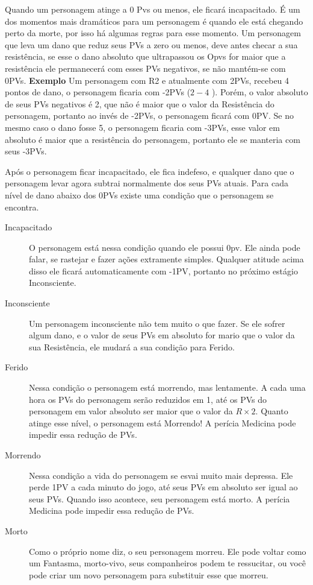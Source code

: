 Quando um personagem atinge a 0 Pvs ou menos, ele ficará incapacitado. É um dos momentos mais dramáticos para um personagem é quando ele está chegando perto da morte, por isso há algumas regras para esse momento. Um personagem que leva um dano que reduz seus PVs a zero ou menos, deve antes checar a sua resistência, se esse o dano absoluto que ultrapassou os Opvs for maior que a resistência ele permanecerá com esses PVs negativos, se não mantém-se com 0PVs. {\bf Exemplo } Um personagem com R2 e atualmente com 2PVs, recebeu 4 pontos de dano, o personagem ficaria com -2PVs (\( 2 -4 \) ). Porém, o valor absoluto de seus PVs negativos é 2, que não é maior que o valor da Resistência do personagem, portanto ao invés de -2PVs, o personagem ficará com 0PV. Se no mesmo caso o dano fosse 5, o personagem ficaria com -3PVs, esse valor em absoluto é maior que a resistência do personagem, portanto ele se manteria com seus -3PVs.

Após o personagem ficar incapacitado, ele fica indefeso, e qualquer dano que o personagem levar agora subtrai normalmente dos seus PVs atuais. Para cada nível de dano abaixo dos 0PVs existe uma condição que o personagem se encontra.


\begin{description}
\item[Incapacitado] O personagem está nessa condição quando ele possui 0pv. Ele ainda pode falar, se rastejar e fazer ações extramente simples. Qualquer atitude acima disso ele ficará automaticamente com -1PV, portanto no próximo estágio Inconsciente.
\item[Inconsciente] Um personagem inconsciente não tem muito o que fazer. Se ele sofrer algum dano, e o valor de seus PVs em absoluto for mario que o valor da sua Resistência, ele mudará a sua condição para Ferido.
\item[Ferido] Nessa condição o personagem está morrendo, mas lentamente. A cada uma hora os PVs do personagem serão reduzidos em 1, até os PVs do personagem em valor absoluto ser maior que o valor da \( R \times 2 \). Quanto atinge esse nível, o personagem está Morrendo! A perícia Medicina pode impedir essa redução de PVs.
\item[Morrendo] Nessa condição a vida do personagem se esvai muito mais depressa. Ele perde 1PV a cada minuto do jogo, até seus PVs em absoluto ser igual ao seus PVs. Quando isso acontece, seu personagem está morto. A perícia Medicina pode impedir essa redução de PVs.
\item[Morto] Como o próprio nome diz, o seu personagem morreu. Ele pode voltar como um Fantasma, morto-vivo, seus companheiros podem te ressucitar, ou você pode criar um novo personagem para substituir esse que morreu.
\end{description}

